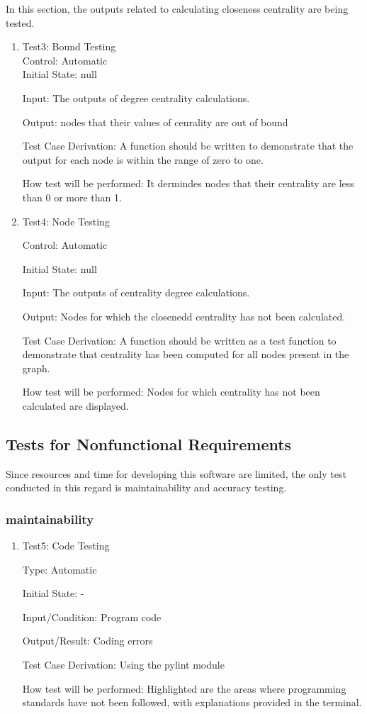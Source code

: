 \documentclass[12pt, titlepage]{article}
\begin{document}
In this section, the outputs related to calculating closeness centrality are being tested.

\begin{enumerate}

\item{Test3: Bound Testing\\}	
Control: Automatic	\\			
Initial State: null
					
Input:  The outputs of degree centrality calculations.
					
Output: nodes that their values of cenrality are out of bound

Test Case Derivation: A function should be written to demonstrate that the output for each node is within the range of zero to one.

How test will be performed: It dermindes nodes that their centrality are less than 0 or more than 1.
\item{Test4: Node Testing\\}

Control: Automatic
					
Initial State: null
					
Input:  The outputs of centrality degree calculations.
					
Output: Nodes for which the closenedd centrality has not been calculated.

Test Case Derivation: A function should be written as a test function to demonstrate that centrality has been computed for all nodes present in the graph.

How test will be performed: Nodes for which centrality has not been calculated are displayed.



\end{enumerate}

\subsection{Tests for Nonfunctional Requirements}
Since resources and time for developing this software are limited, the only test conducted in this regard is maintainability and accuracy testing. 

\subsubsection{maintainability}
		

\begin{enumerate}

\item{Test5: Code Testing\\}

Type: Automatic
					
Initial State: -
					
Input/Condition: Program code
					
Output/Result: Coding errors

Test Case Derivation: Using the pylint module
					
How test will be performed:  Highlighted are the areas where programming standards have not been followed, with explanations provided in the terminal.
\end{enumerate}
\end{document}
